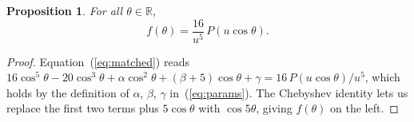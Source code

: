 \documentclass[10pt,a4paper]{amsart}
\newtheorem{proposition}{Proposition}
\begin{document}
\begin{proposition}\label{prop:fP}
For all $\theta \in \mathbb{R}$,
\begin{equation}\label{eq:fP}
f(\theta) = \frac{16}{u^5}\,P(u\cos\theta).
\end{equation}
\end{proposition}

\begin{proof}
Equation~(\ref{eq:matched}) reads $16\cos^5\!\theta - 20\cos^3\!\theta + \alpha\cos^2\!\theta + (\beta+5)\cos\theta + \gamma = 16\,P(u\cos\theta)/u^5$, which holds by the definition of $\alpha$, $\beta$, $\gamma$ in~(\ref{eq:params}). The Chebyshev identity lets us replace the first two terms plus $5\cos\theta$ with $\cos 5\theta$, giving $f(\theta)$ on the left.
\end{proof}
\end{document}
